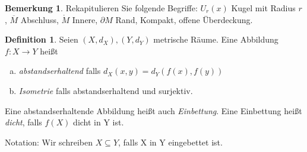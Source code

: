 \documentclass[ngerman]{report}
\theoremstyle{plain}%
\theoremstyle{definition}%
\newtheorem{definition}[thm]{Definition}
\theoremstyle{myStyle}
\newtheorem{bem}[thm]{Bemerkung}
\begin{document}
	\begin{bem}Rekapitulieren Sie folgende Begriffe:
		$U_r(x)$ Kugel mit Radius $r$,	$\overline{M}$ Abschluss,	$\mathring{M}$ Innere,	$\partial M$ Rand,	Kompakt,	offene Überdeckung.
	\end{bem}
	
\begin{definition} %
	Seien $(X,d_X),(Y,d_Y)$ metrische Räume. Eine Abbildung $f:X\to Y$ heißt
	\begin{enumerate}[(a)]
		\item \textit{abstandserhaltend} falls $d_X(x,y)=d_Y(f(x),f(y))$ %
		\item \textit{Isometrie} falls abstandserhaltend und surjektiv.
	\end{enumerate}
	Eine abstandserhaltende  Abbildung heißt auch \textit{Einbettung}. Eine Einbettung heißt \textit{dicht}, falls $f(X)$ dicht in Y ist.\par
	Notation: Wir schreiben $X\subseteq Y$, falls X in Y eingebettet ist.
\end{definition}
\end{document}
